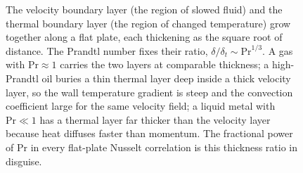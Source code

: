 \begin{figure}[htbp]
\centering
{}
\caption[Velocity and thermal boundary-layer thickness by Prandtl number]{The
velocity boundary layer (the region of slowed fluid) and the thermal boundary
layer (the region of changed temperature) grow together along a flat plate,
each thickening as the square root of distance. The Prandtl number fixes their
ratio, $\delta/\delta_t \sim \text{Pr}^{1/3}$. A gas with $\text{Pr}\approx 1$
carries the two layers at comparable thickness; a high-Prandtl oil buries a
thin thermal layer deep inside a thick velocity layer, so the wall temperature
gradient is steep and the convection coefficient large for the same velocity
field; a liquid metal with $\text{Pr}\ll 1$ has a thermal layer far thicker than
the velocity layer because heat diffuses faster than momentum. The fractional
power of $\text{Pr}$ in every flat-plate Nusselt correlation is this thickness
ratio in disguise.}
\label{fig:vol04ch05:prandtl-layers}
\end{figure}
